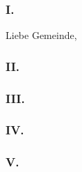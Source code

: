 \documentclass[JJJJMMTT-SONNTAG-Liturgie]{subfiles}
\begin{document}
 \begin{predigt}

\subsubsection{I.} %

Liebe Gemeinde,

\begin{predigttextu}
\end{predigttextu}

\subsubsection{II.}

\subsubsection{III.}

\subsubsection{IV.}

\subsubsection{V.}

\end{predigt} 
\end{document}
